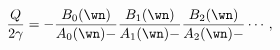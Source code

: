 \begin{equation}
{Q\over 2\gamma} = - 
{B_0(\wn)\over A_0(\wn)-}{B_1(\wn)\over A_1(\wn)-}
{B_2(\wn)\over A_2(\wn)-}\cdots\,, 
\label{eigen}
\end{equation}

